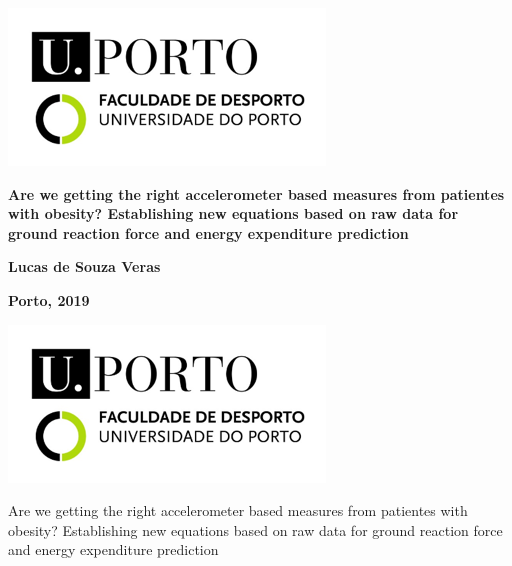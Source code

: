 \documentclass[12pt]{article}
\def\blankpage{%
      \clearpage%
      \thispagestyle{empty}%
      \addtocounter{page}{+0}%
      \null%
      \clearpage}
\begin{document}

\begin{center}
\includegraphics[width=\columnwidth]{figs/UPorto.png}

\vspace{6em}

\textbf{\Large Are we getting the right accelerometer based measures from patientes with obesity? Establishing new equations based on raw data for ground reaction force and energy expenditure prediction}

\vspace{\fill}

\textbf{Lucas de Souza Veras}

\medskip

\textbf{Porto, 2019}
\end{center}

\thispagestyle{empty}
\blankpage

\begin{center}
\includegraphics{figs/UPorto.png}


\vspace{4em}

\Large Are we getting the right accelerometer based measures from patientes with obesity? Establishing new equations based on raw data for ground reaction force and energy expenditure prediction
\end{center}

\vspace{6em}
\end{document}
